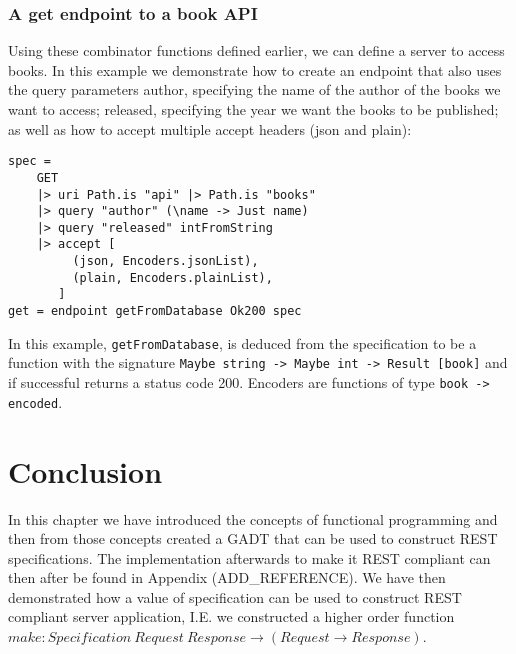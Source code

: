 \subsubsection{A get endpoint to a book API}

Using these combinator functions defined earlier, we can define a server to
access books. In this example we demonstrate how to create an endpoint that also
uses the query parameters author, specifying the name of the author of the books
we want to access; released, specifying the year we want the books to be
published; as well as how to accept multiple accept headers (json and plain):


\begin{lstlisting}
spec = 
    GET
    |> uri Path.is "api" |> Path.is "books"
    |> query "author" (\name -> Just name)
    |> query "released" intFromString
    |> accept [
         (json, Encoders.jsonList),
         (plain, Encoders.plainList),
       ]
get = endpoint getFromDatabase Ok200 spec
\end{lstlisting}

In this example, \texttt{getFromDatabase}, is deduced from the specification to
be a function with the signature \texttt{Maybe string -> Maybe int -> Result
[book]} and if successful returns a status code 200. Encoders are functions of
type \texttt{book -> encoded}. 

\section{Conclusion}

In this chapter we have introduced the concepts of functional programming and
then from those concepts created a GADT that can be used to construct REST
specifications. The implementation afterwards to make it REST compliant can then
after be found in Appendix (ADD\_REFERENCE). We have then demonstrated how a
value of specification can be used to construct REST compliant server
application, I.E. we constructed a higher order function $make : Specification\
Request\ Response \rightarrow (Request\rightarrow Response)$.
